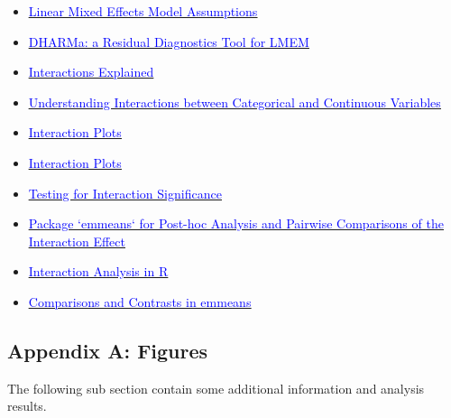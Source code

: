 \documentclass[
]{article}
\providecommand{\tightlist}{%
  \setlength{\itemsep}{0pt}\setlength{\parskip}{0pt}}
\begin{document}
\begin{itemize}
  \begin{itemize}
  \tightlist
  \item
    \href{https://besjournals.onlinelibrary.wiley.com/doi/10.1111/2041-210X.13434}{\underline{\textcolor{blue}{Linear Mixed Effects Model Assumptions}}}
  \item
    \href{https://cran.r-project.org/web/packages/DHARMa/vignettes/DHARMa.html}{\underline{\textcolor{blue}{DHARMa: a Residual Diagnostics Tool for LMEM}}}
  \item
    \href{www.medicine.mcgill.ca/epidemiology/Joseph/courses/EPIB-621/interaction.pdf}{\underline{\textcolor{blue}{Interactions Explained}}}
  \item
    \href{https://www.theanalysisfactor.com/interactions-categorical-and-continuous-variables/}{\underline{\textcolor{blue}{Understanding Interactions between Categorical and Continuous Variables}}}
  \item
    \href{https://ademos.people.uic.edu/Chapter13.html}{\underline{\textcolor{blue}{Interaction Plots}}}
  \item
    \href{https://rpubs.com/tf_peterson/interactionplotDemo}{\underline{\textcolor{blue}{Interaction Plots}}}
  \item
    \href{https://mcfromnz.wordpress.com/2011/03/02/anova-type-iiiiii-ss-explained/}{\underline{\textcolor{blue}{Testing for Interaction Significance}}}
  \item
    \href{https://cran.r-project.org/web/packages/emmeans/vignettes/interactions.html}{\underline{\textcolor{blue}{Package `emmeans` for Post-hoc Analysis and Pairwise Comparisons of the Interaction Effect}}}
  \item
    \href{https://stats.oarc.ucla.edu/r/seminars/interactions-r/}{\underline{\textcolor{blue}{Interaction Analysis in R}}}
  \item
    \href{https://cran.r-project.org/web/packages/emmeans/vignettes/comparisons.html}{\underline{\textcolor{blue}{Comparisons and Contrasts in emmeans}}}
  \end{itemize}
\end{itemize}

\pagebreak

\hypertarget{appendix-a-figures}{%
\subsection{Appendix A: Figures}\label{appendix-a-figures}}

The following sub section contain some additional information and
analysis results.
\end{document}
